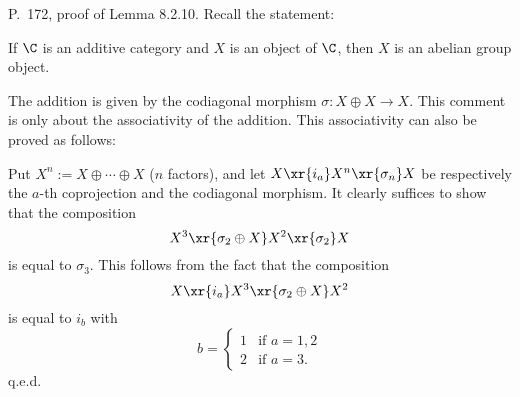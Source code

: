 \documentclass[12pt]{article}
\theoremstyle{remark}
\theoremstyle{definition}
\begin{document}
%

\begin{s} 
P.~172, proof of Lemma 8.2.10. Recall the statement: 

If $\C$ is an additive category and $X$ is an object of $\C$, then $X$ is an abelian group object. 

The addition is given by the codiagonal morphism $\sigma:X\oplus X\to X$. This comment is only about the associativity of the addition. This associativity can also be proved as follows:

Put $X^n:=X\oplus\cdots\oplus X$ ($n$ factors), and let $X\xr{i_a}X^n\xr{\sigma_n}X$ be respectively the $a$-th coprojection and the codiagonal morphism. It clearly suffices to show that the composition 
$$
X^3\xr{\sigma_2\oplus X}X^2\xr{\sigma_2}X
$$ 
is equal to $\sigma_3$. This follows from the fact that the composition 
$$
X\xr{i_a}X^3\xr{\sigma_2\oplus X}X^2
$$ 
is equal to $i_b$ with 
$$
b=\begin{cases}1&\text{if }a=1,2\\2&\text{if }a=3.\end{cases}
$$ 
q.e.d.
\end{s}

%
\end{document}
